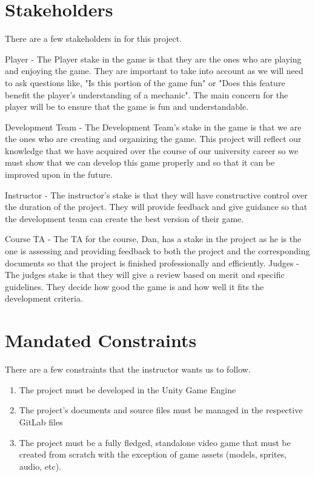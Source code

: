 \documentclass{article}
\begin{document}
\section{Stakeholders}
\quad There are a few stakeholders in for this project.\par
Player -  The Player stake in the game is that they are the ones who are playing and enjoying the game. They are important to take into account as we will need to ask questions like, "Is this portion of the game fun" or "Does this feature benefit the player's understanding of a mechanic". The main concern for the player will be to ensure that the game is fun and understandable. \par
Development Team - The Development Team's stake in the game is that we are the ones who are creating and organizing the game. This project will reflect our knowledge that we have acquired over the course of our university career so we must show that we can develop this game properly and so that it can be improved upon in the future. \par
Instructor - The instructor's stake is that they will have constructive control over the duration of the project. They will provide feedback and give guidance so that the development team can create the best version of their game.\par
Course TA - The TA for the course, Dan, has a stake in the project as he is the one is assessing and providing feedback to both the project and the corresponding documents so that the project is finished professionally and efficiently.
Judges - The judges stake is that they will give a review based on merit and specific guidelines. They decide how good the game is and how well it fits the development criteria.
\section{Mandated Constraints}
\quad There are a few constraints that the instructor wants us to follow.
\begin{enumerate}[{MC}1. ]
	\item The project must be developed in the Unity Game Engine
	\item The project's documents and source files must be managed in the respective GitLab files
	\item The project must  be a fully fledged, standalone video game that must be created from scratch with the exception of game assets (models, sprites, audio, etc).
\end{enumerate}
\end{document}
